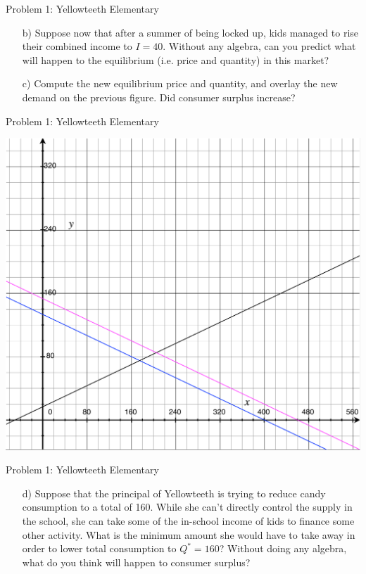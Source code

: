 \documentclass[10pt]{beamer}
\begin{document}
\begin{frame}[t]{Problem 1: Yellowteeth Elementary}
    \begin{enumerate}
        \item[b)] Suppose now that after a summer of being locked up, kids managed to rise their combined income to \(I = 40\). Without any algebra, can you predict what will happen to the equilibrium (i.e. price and quantity) in this market?
        \item[c)] Compute the new equilibrium price and quantity, and overlay the new demand on the previous figure. Did consumer surplus increase?
    \end{enumerate}
\end{frame}

\begin{frame}{Problem 1: Yellowteeth Elementary}
    \begin{center}
        \includegraphics[width=.75\textwidth]{prob1.pdf}
    \end{center}
\end{frame}

\begin{frame}[t]{Problem 1: Yellowteeth Elementary}
    \begin{enumerate}
        \item[d)] Suppose that the principal of Yellowteeth is trying to reduce candy consumption to a total of 160.
        While she can't directly control the supply in the school, she can take some of the in-school income of kids to finance some other activity.
        What is the minimum amount she would have to take away in order to lower total consumption to \(Q^* = 160\)?
        Without doing any algebra, what do you think will happen to consumer surplus?
    \end{enumerate}
\end{frame}
\end{document}
